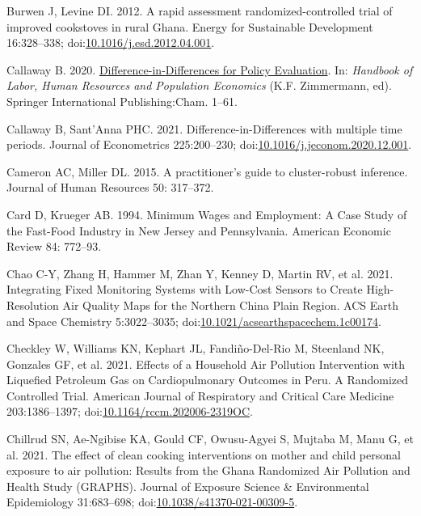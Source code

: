 \documentclass[
  letterpaper,
  DIV=11,
  numbers=noendperiod]{scrartcl}
\newlength{\cslhangindent}
\newlength{\cslentryspacingunit} %
\newenvironment{CSLReferences}[2] %
 {%
  \setlength{\parindent}{0pt}
  \ifodd #1
  \let\oldpar\par
  \def\par{\hangindent=\cslhangindent\oldpar}
  \fi
  \setlength{\parskip}{#2\cslentryspacingunit}
 }%
 {}
\begin{document}
\begin{CSLReferences}{1}{0}
\leavevmode{}%
Burwen J, Levine DI. 2012. A rapid assessment randomized-controlled
trial of improved cookstoves in rural {Ghana}. Energy for Sustainable
Development 16:328--338;
doi:\href{https://doi.org/10.1016/j.esd.2012.04.001}{10.1016/j.esd.2012.04.001}.

\leavevmode{}%
Callaway B. 2020.
\href{https://doi.org/10.1007/978-3-319-57365-6_352-1}{Difference-in-{Differences}
for {Policy Evaluation}}. In: \emph{Handbook of {Labor}, {Human
Resources} and {Population Economics}} (K.F. Zimmermann, ed). Springer
International Publishing:Cham. 1--61.

\leavevmode{}%
Callaway B, Sant'Anna PHC. 2021. Difference-in-{Differences} with
multiple time periods. Journal of Econometrics 225:200--230;
doi:\href{https://doi.org/10.1016/j.jeconom.2020.12.001}{10.1016/j.jeconom.2020.12.001}.

\leavevmode{}%
Cameron AC, Miller DL. 2015. A practitioner's guide to cluster-robust
inference. Journal of Human Resources 50: 317--372.

\leavevmode{}%
Card D, Krueger AB. 1994. Minimum {Wages} and {Employment}: {A Case
Study} of the {Fast-Food Industry} in {New Jersey} and {Pennsylvania}.
American Economic Review 84: 772--93.

\leavevmode{}%
Chao C-Y, Zhang H, Hammer M, Zhan Y, Kenney D, Martin RV, et al. 2021.
Integrating {Fixed Monitoring Systems} with {Low-Cost Sensors} to
{Create High-Resolution Air Quality Maps} for the {Northern China Plain
Region}. ACS Earth and Space Chemistry 5:3022--3035;
doi:\href{https://doi.org/10.1021/acsearthspacechem.1c00174}{10.1021/acsearthspacechem.1c00174}.

\leavevmode{}%
Checkley W, Williams KN, Kephart JL, Fandiño-Del-Rio M, Steenland NK,
Gonzales GF, et al. 2021. Effects of a {Household Air Pollution
Intervention} with {Liquefied Petroleum Gas} on {Cardiopulmonary
Outcomes} in {Peru}. {A Randomized Controlled Trial}. American Journal
of Respiratory and Critical Care Medicine 203:1386--1397;
doi:\href{https://doi.org/10.1164/rccm.202006-2319OC}{10.1164/rccm.202006-2319OC}.

\leavevmode{}%
Chillrud SN, Ae-Ngibise KA, Gould CF, Owusu-Agyei S, Mujtaba M, Manu G,
et al. 2021. The effect of clean cooking interventions on mother and
child personal exposure to air pollution: Results from the {Ghana
Randomized Air Pollution} and {Health Study} ({GRAPHS}). Journal of
Exposure Science \& Environmental Epidemiology 31:683--698;
doi:\href{https://doi.org/10.1038/s41370-021-00309-5}{10.1038/s41370-021-00309-5}.


\end{CSLReferences}
\end{document}
